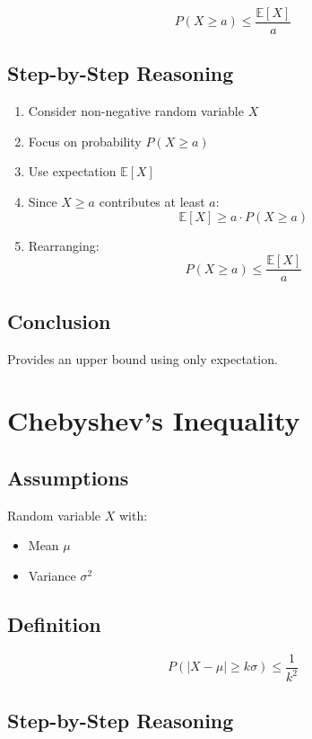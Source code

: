 \documentclass[12pt]{article}
\begin{document}
\[
P(X \ge a) \le \frac{\mathbb{E}[X]}{a}
\]

\subsection{Step-by-Step Reasoning}

\begin{enumerate}
\item Consider non-negative random variable $X$
\item Focus on probability $P(X \ge a)$
\item Use expectation $\mathbb{E}[X]$
\item Since $X \ge a$ contributes at least $a$:
\[
\mathbb{E}[X] \ge a \cdot P(X \ge a)
\]
\item Rearranging:
\[
P(X \ge a) \le \frac{\mathbb{E}[X]}{a}
\]
\end{enumerate}

\subsection{Conclusion}

Provides an upper bound using only expectation.

\section{Chebyshev's Inequality}

\subsection{Assumptions}

Random variable $X$ with:

\begin{itemize}
\item Mean $\mu$
\item Variance $\sigma^2$
\end{itemize}

\subsection{Definition}

\[
P(|X - \mu| \ge k\sigma) \le \frac{1}{k^2}
\]

\subsection{Step-by-Step Reasoning}
\end{document}

